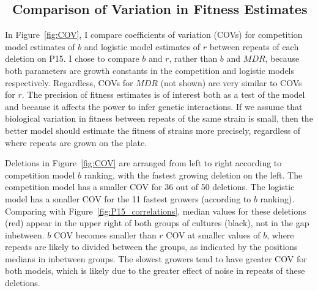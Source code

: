 \begin{multicols}{2}



\subsection{\thesubsection~Comparison of Variation in Fitness Estimates}



In Figure~\ref{fig:COV}, I compare coefficients of variation (COVs)
for competition model estimates of \(b\) and logistic model estimates
of \(r\) between repeats of each deletion on P15. I chose to compare
\(b\) and \(r\), rather than \(b\) and \(MDR\), because both
parameters are growth constants in the competition and logistic models
respectively. Regardless, COVs for \(MDR\) (not shown) are very
similar to COVs for \(r\). The precision of fitness estimates is of
interest both as a test of the model and because it affects the power
to infer genetic interactions. If we assume that biological variation
in fitness between repeats of the same strain is small, then the
better model should estimate the fitness of strains more precisely,
regardless of where repeats are grown on the plate.

Deletions in Figure~\ref{fig:COV} are arranged from left to right
according to competition model \(b\) ranking, with the fastest growing
deletion on the left. The competition model has a smaller COV for 36
out of 50 deletions. The logistic model has a smaller COV for the 11
fastest growers (according to \(b\) ranking). Comparing with
Figure~\ref{fig:P15_correlations}, median values for these deletions
(red) appear in the upper right of both groups of cultures (black),
not in the gap inbetween. \(b\) COV becomes smaller than \(r\) COV at
smaller values of \(b\), where repeats are likely to divided between
the groups, as indicated by the positions medians in inbetween
groups. The slowest growers tend to have greater COV for both models,
which is likely due to the greater effect of noise in repeats of these
deletions.

\end{multicols}
